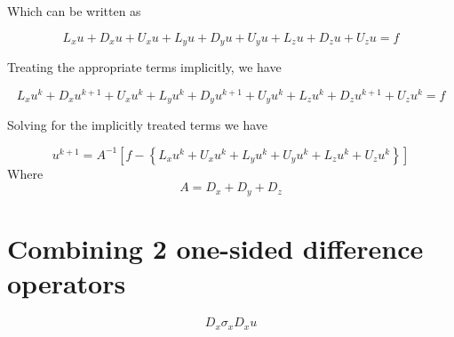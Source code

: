 \documentclass[11pt]{article}
\begin{document}
Which can be written as

\begin{equation}
	L_x u + D_x u + U_x u +
	L_y u + D_y u + U_y u +
	L_z u + D_z u + U_z u
	= f
\end{equation}

Treating the appropriate terms implicitly, we have

\begin{equation}
	L_x u^{k} + D_x u^{k+1} + U_x u^{k} +
	L_y u^{k} + D_y u^{k+1} + U_y u^{k} +
	L_z u^{k} + D_z u^{k+1} + U_z u^{k}
	= f
\end{equation}

Solving for the implicitly treated terms we have

\begin{equation}
	u^{k+1}
	= 
	A^{-1}
	\left[
	f - 
	\left\{
	L_x u^{k} + U_x u^{k} +
	L_y u^{k} + U_y u^{k} +
	L_z u^{k} + U_z u^{k}
	\right\}
	\right]
\end{equation}
Where
\begin{equation}
	A = 
	D_x +
	D_y +
	D_z
\end{equation}

\section{Combining 2 one-sided difference operators}
\begin{equation}
	D_x \sigma_x D_x u
\end{equation}
\end{document}
